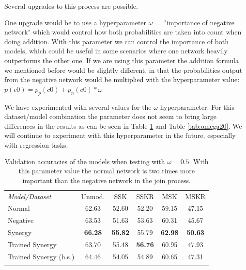 \documentclass[b5paper]{book}
\begin{document}
Several upgrades to this process are possible.

One upgrade would be to use a hyperparameter \( \omega = \) "importance of negative network"  which would control how both probabilities are taken into count when doing addition. With this parameter we can control the importance of both models, which could be useful in some scenarios where one network heavily outperforms the other one. If we are using this parameter the addition formula we mentioned before would be slightly different, in that the probabilities output from the negative network would be multiplied with the hyperparameter value: \( p(c0) = p_p(c0) + p_n(c0) * \omega \)

We have experimented with several values for the $ \omega $ hyperparameter. For this dataset/model combination the parameter does not seem to bring large differences in the results as can be seen in Table \ref{tab:omega05} and Table \ref{tab:omega20}. We will continue to experiment with this hyperparameter in the future, especially with regression tasks.

\begin{table}
\centering
\caption{Validation accuracies of the models when testing with $\omega = 0.5$. With this parameter value the normal network is two times more important than the negative network in the join process.}
\label{tab:omega05}
\tabcolsep=0.06cm
\begin{tabular}{lccccc}
\hline\noalign{\smallskip}
\emph{Model/Dataset} & Unmod. & SSK & SSKR & MSK & MSKR \\
\noalign{\smallskip}\hline\noalign{\smallskip}
Normal & 62.63 & 52.60 & 52.20 & 59.15 & 47.15 \\
Negative & 63.53 & 51.63 & 53.63 & 60.31 & 45.67 \\
Synergy & \textbf{66.28} & \textbf{55.82} & 55.79 & \textbf{62.98} & \textbf{50.63} \\
Trained Synergy & 63.70 & 55.48 & \textbf{56.76} & 60.95 & 47.93 \\
Trained Synergy (h.s.) & 64.46 & 54.05 & 54.89 & 60.65 & 47.31 \\
\noalign{\smallskip}\hline
\end{tabular}
\end{table}
\end{document}
